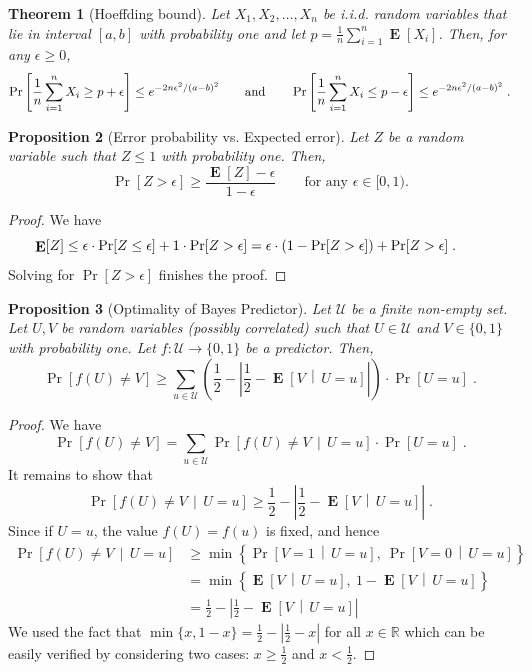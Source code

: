 \documentclass[10pt]{article}
\newtheorem{proposition}{Proposition}
\newtheorem{theorem}[proposition]{Theorem}
\newcommand{\R}{\mathbb{R}}
\newcommand{\U}{\mathcal{U}}
\DeclareMathOperator{\Exp}{\mathbf{E}}
\begin{document}
\begin{theorem}[Hoeffding bound]
Let $X_1, X_2, \dots, X_n$ be i.i.d. random variables that lie in interval
$[a,b]$ with probability one and let $p=\frac{1}{n}\sum_{i=1}^n \Exp[X_i]$.
Then, for any $\epsilon \ge 0$,
$$
\Pr \left[{\frac {1}{n}} \sum_{i=1}^n X_i \ge p + \epsilon \right] \le e^{ - 2n \epsilon^2/(a-b)^2}  \qquad \text{and} \qquad
\Pr \left[{\frac {1}{n}} \sum_{i=1}^n X_i \le p - \epsilon \right] \le e^{ - 2n \epsilon^2/(a-b)^2}  \; . \\
$$
\end{theorem}

\begin{proposition}[Error probability vs. Expected error]
\label{proposition:error-probability-vs-expected-error}
Let $Z$ be a random variable such that $Z \le 1$ with probability one.
Then,
$$
\Pr[Z > \epsilon] \ge \frac{\Exp[Z] - \epsilon}{1 - \epsilon} \qquad \text{for any $\epsilon \in [0, 1)$.}
$$
\end{proposition}

\begin{proof}
We have
$$
\Exp[Z]
\le \epsilon \cdot \Pr[Z \le \epsilon] + 1 \cdot \Pr[Z > \epsilon]
= \epsilon \cdot (1 - \Pr[Z > \epsilon]) + \Pr[Z > \epsilon] \; .  \qquad \qedhere
$$
Solving for $\Pr[Z > \epsilon]$ finishes the proof.
\end{proof}

\begin{proposition}[Optimality of Bayes Predictor]
\label{proposition:bayes}
Let $\U$ be a finite non-empty set. Let $U,V$ be random variables (possibly
correlated) such that $U \in \U$ and $V \in \{0,1\}$ with probability one. Let
$f:\U \to \{0,1\}$ be a predictor. Then,
$$
\Pr\left[ f(U) \neq V \right]
\ge \sum_{u \in \U} \left( \frac{1}{2} - \left| \frac{1}{2} -  \Exp \left[V \, \middle| \, U = u\right] \right| \right) \cdot \Pr[U = u] \; .
$$
\end{proposition}

\begin{proof}
We have
$$
\Pr \left[ f(U) \neq V \right] = \sum_{u \in \U} \Pr \left[ f(U) \neq V \, \middle| \, U = u \right] \cdot \Pr[U = u] \; .
$$
It remains to show that
$$
\Pr\left[ f(U) \neq V \, \middle| \, U = u \right]
\ge
\frac{1}{2} - \left| \frac{1}{2} -  \Exp \left[V \, \middle| \, U = u \right] \right| \; .
$$
Since if  $U=u$, the value $f(U) = f(u)$ is fixed, and hence
\begin{align*}
\Pr\left[ f(U) \neq V \, \middle| \, U = u \right]
& \ge \min\left\{ \Pr \left[ V = 1 \, \middle| \, U = u \right], \ \Pr \left[ V = 0 \, \middle| \, U = u \right] \right\} \\
& = \min\left\{ \Exp \left[ V  \, \middle| \, U = u \right], \ 1 - \Exp \left[ V \, \middle| \, U = u \right] \right\} \\
& = \frac{1}{2} - \left| \frac{1}{2} -  \Exp \left[ V  \, \middle| \, U = u \right] \right|
\end{align*}
We used the fact that $\min\{x, 1 - x\} = \frac{1}{2} - \left| \frac{1}{2} - x \right|$ for all $x \in \R$
which can be easily verified by considering two cases: $x \ge \frac{1}{2}$ and $x < \frac{1}{2}$.
\end{proof}
\end{document}
